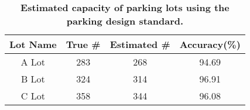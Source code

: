 \begin{table}[t]
\begin{threeparttable}
{\small
\begin{tabularx}{\columnwidth}{cccc}
{\normalsize{\textbf{Lot Name}}} & 
{\normalsize{\textbf{True \# }}} & 
{\normalsize{\textbf{Estimated \# }}} &
{\normalsize{\textbf{Accuracy(\%)}}} \\
\toprule
A Lot & 283 & 268 & 94.69 \\
B Lot & 324 & 314 & 96.91 \\
C Lot & 358 & 344 & 96.08 \\
\end{tabularx}
}
\caption{\textbf{Estimated capacity of parking lots using the parking design standard.}}
\label{table-capacity}
\end{threeparttable}
\end{table}
